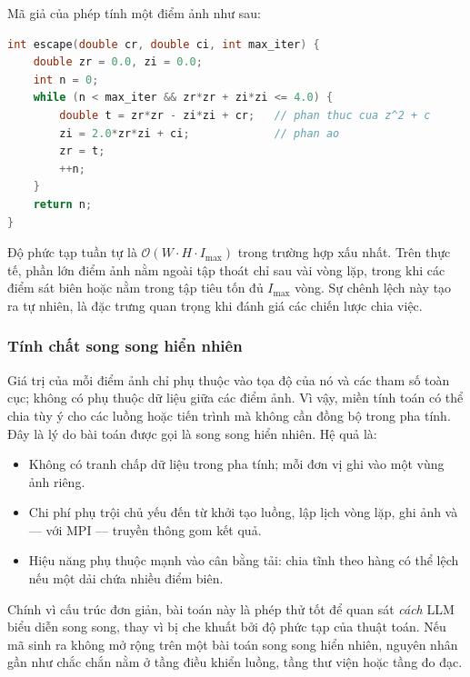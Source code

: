 \noindent\begin{minipage}{\linewidth}
Mã giả của phép tính một điểm ảnh như sau:
\begin{lstlisting}[language=C++,caption={Tính số vòng lặp thoát cho một điểm ảnh.},label={lst:escape},numbers=none]
int escape(double cr, double ci, int max_iter) {
    double zr = 0.0, zi = 0.0;
    int n = 0;
    while (n < max_iter && zr*zr + zi*zi <= 4.0) {
        double t = zr*zr - zi*zi + cr;   // phan thuc cua z^2 + c
        zi = 2.0*zr*zi + ci;             // phan ao
        zr = t;
        ++n;
    }
    return n;
}
\end{lstlisting}
\end{minipage}

Độ phức tạp tuần tự là $\mathcal{O}(W\cdot H\cdot I_{\max})$ trong trường hợp xấu
nhất. Trên thực tế, phần lớn điểm ảnh nằm ngoài tập thoát chỉ sau vài vòng lặp,
trong khi các điểm sát biên hoặc nằm trong tập tiêu tốn đủ $I_{\max}$ vòng. Sự
chênh lệch này tạo ra  tự nhiên, là đặc trưng quan trọng
khi đánh giá các chiến lược chia việc.

\subsubsection{Tính chất song song hiển nhiên}

Giá trị của mỗi điểm ảnh chỉ phụ thuộc vào tọa độ của nó và các tham số toàn cục;
không có phụ thuộc dữ liệu giữa các điểm ảnh. Vì vậy, miền tính toán có thể chia
tùy ý cho các luồng hoặc tiến trình mà không cần đồng bộ trong pha tính. Đây là
lý do bài toán được gọi là song song hiển nhiên. Hệ quả là:

\begin{itemize}
  \item Không có tranh chấp dữ liệu trong pha tính; mỗi đơn vị ghi vào một vùng
        ảnh riêng.
  \item Chi phí phụ trội chủ yếu đến từ khởi tạo luồng, lập lịch vòng lặp, ghi
        ảnh và — với MPI — truyền thông gom kết quả.
  \item Hiệu năng phụ thuộc mạnh vào cân bằng tải: chia tĩnh theo hàng có thể
        lệch nếu một dải chứa nhiều điểm biên.
\end{itemize}

Chính vì cấu trúc đơn giản, bài toán này là phép thử tốt để quan sát \emph{cách}
LLM biểu diễn song song, thay vì bị che khuất bởi độ phức tạp của thuật toán.
Nếu mã sinh ra không mở rộng trên một bài toán song song hiển nhiên, nguyên nhân
gần như chắc chắn nằm ở tầng điều khiển luồng, tầng thư viện hoặc tầng đo đạc.

